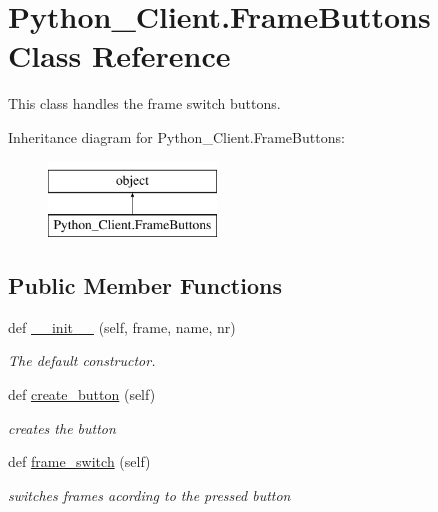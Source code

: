 \hypertarget{class_python___client_1_1_frame_buttons}{}\section{Python\+\_\+\+Client.\+Frame\+Buttons Class Reference}
\label{class_python___client_1_1_frame_buttons}


This class handles the frame switch buttons.  


Inheritance diagram for Python\+\_\+\+Client.\+Frame\+Buttons\+:\begin{figure}[H]
\begin{center}
\leavevmode
\includegraphics[height=2.000000cm]{class_python___client_1_1_frame_buttons}
\end{center}
\end{figure}
\subsection*{Public Member Functions}
\begin{DoxyCompactItemize}
\item 
def \mbox{\hyperlink{class_python___client_1_1_frame_buttons_a903927dea8f58c84d0a28ce980d1914a}{\+\_\+\+\_\+init\+\_\+\+\_\+}} (self, frame, name, nr)
\begin{DoxyCompactList}\small\item\em The default constructor. \end{DoxyCompactList}\item 
def \mbox{\hyperlink{class_python___client_1_1_frame_buttons_aeb5a8761dfb5bf6c2c1bd96ffee5f8fe}{create\+\_\+button}} (self)
\begin{DoxyCompactList}\small\item\em creates the button \end{DoxyCompactList}\item 
def \mbox{\hyperlink{class_python___client_1_1_frame_buttons_abeb6a6d56e4f66ae470b10ac5c849ebb}{frame\+\_\+switch}} (self)
\begin{DoxyCompactList}\small\item\em switches frames acording to the pressed button \end{DoxyCompactList}\end{DoxyCompactItemize}
